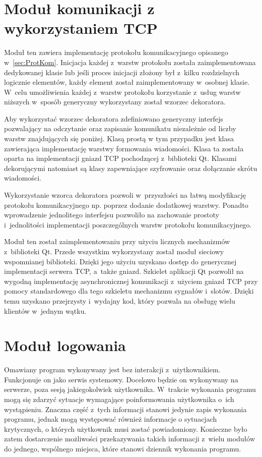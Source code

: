 \section[Moduł TCP][Moduł komunikacji z wykorzystaniem TCP]{Moduł komunikacji z wykorzystaniem TCP}

Moduł ten zawiera implementację protokołu komunikacyjnego opisanego
w~\ref{sec:ProtKom}. Inicjacja każdej z~warstw protokołu została
zaimplementowana dedykowanej klasie lub jeśli proces inicjacji złożony
był z~kilku rozdzielnych logicznie elementów, każdy element został
zaimplementowany w~osobnej klasie. W~celu umożliwienia każdej z~warstw
protokołu korzystanie z~usług warstw niższych w~sposób generyczny
wykorzystany został wzorzec dekoratora.

Aby wykorzystać wzorzec dekoratora zdefiniowano generyczny interfejs
pozwalający na odczytanie oraz zapisanie komunikatu niezależnie od
liczby warstw znajdujących się poniżej. Klasą prostą w tym przypadku
jest klasa zawierająca implementację warstwy formowania
wiadomości. Klasa ta została oparta na implementacji gniazd TCP
pochodzącej z~biblioteki Qt. Klasami dekorującymi natomiast są klasy
zapewniające szyfrowanie oraz dołączanie skrótu wiadomości.


Wykorzystanie wzorca dekoratora pozwoli w~przyszłości na łatwą
modyfikację protokołu komunikacyjnego np. poprzez dodanie dodatkowej
warstwy. Ponadto wprowadzenie jednolitego interfejsu pozwoliło na
zachowanie prostoty i~jednolitości implementacji poszczególnych warstw
protokołu komunikacyjnego.

Moduł ten został zaimplementowaniu przy użyciu licznych mechanizmów
z~biblioteki Qt. Przede wszystkim wykorzystany został moduł sieciowy
wspomnianej biblioteki. Dzięki jego użyciu uzyskano dostęp do
generycznej implementacji serwera TCP, a~także gniazd. Szkielet
aplikacji Qt pozwolił na wygodną implementację asynchronicznej
komunikacji z~użyciem gniazd TCP przy pomocy standardowego dla tego
szkieletu mechanizmu sygnałów i~slotów. Dzięki temu uzyskano
przejrzysty i~wydajny kod, który pozwala na obsługę wielu klientów
w~jednym wątku.

\section[Moduł logowania][Moduł logowania]{Moduł logowania}

Omawiany program wykonywany jest bez interakcji
z~użytkownikiem. Funkcjonuje on jako serwis systemowy. Docelowo będzie
on wykonywany na serwerze, poza sesją jakiegokolwiek
użytkownika. W~trakcie wykonania programu mogą się zdarzyć sytuacje
wymagające poinformowania użytkownika o~ich wystąpieniu. Znaczna część
z~tych informacji stanowi jedynie zapis wykonania programu, jednak
mogą występować również informacje o sytuacjach krytycznych, o których
użytkownik musi zostać powiadomiony. Konieczne było zatem dostarczenie
możliwości przekazywania takich informacji z~wielu modułów do jednego,
wspólnego miejsca, które stanowi dziennik wykonania programu.

